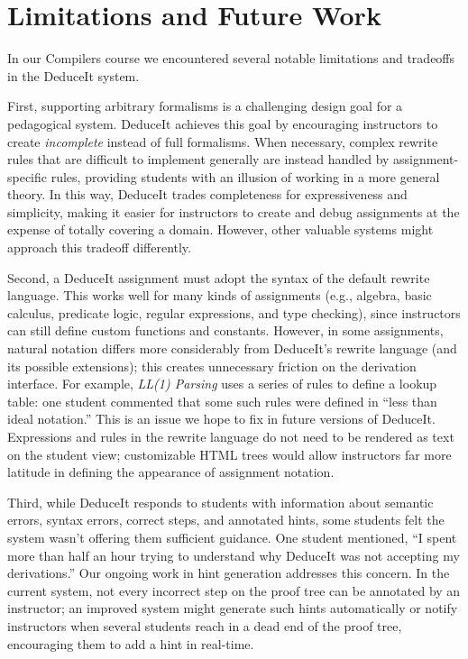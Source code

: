 \documentclass{sigchi}
\begin{document}
\section{Limitations and Future Work}

In our Compilers course we encountered several notable limitations and tradeoffs in the DeduceIt system.

First, supporting arbitrary formalisms is a challenging design goal for a pedagogical system. DeduceIt achieves this goal by encouraging instructors to create \textit{incomplete} instead of full formalisms. When necessary, complex rewrite rules that are difficult to implement generally are instead handled by assignment-specific rules, providing students with an illusion of working in a more general theory. In this way, DeduceIt trades completeness for expressiveness and simplicity, making it easier for instructors to create and debug assignments at the expense of totally covering a domain. However, other valuable systems might approach this tradeoff differently.

Second, a DeduceIt assignment must adopt the syntax of the default rewrite language. This works well for many kinds of assignments (e.g., algebra, basic calculus, predicate logic, regular expressions, and type checking), since instructors can still define custom functions and constants. However, in some assignments, natural notation differs more considerably from DeduceIt's rewrite language (and its possible extensions); this creates unnecessary friction on the derivation interface. For example, \textit{LL(1) Parsing} uses a series of rules to define a lookup table: one student commented that some such rules were defined in ``less than ideal notation.'' %
This is an issue we hope to fix in future versions of DeduceIt. Expressions and rules in the rewrite language do not need to be rendered as text on the student view; customizable HTML trees would allow instructors far more latitude in defining the appearance of assignment notation.

Third, while DeduceIt responds to students with information about semantic errors, syntax errors, correct steps, and annotated hints, some students felt the system wasn't offering them sufficient guidance. One student mentioned, ``I spent more than half an hour trying to understand why DeduceIt was not accepting my derivations.'' Our ongoing work in hint generation addresses this concern. In the current system, not every incorrect step on the proof tree can be annotated by an instructor; an improved system might generate such hints automatically or notify instructors when several students reach in a dead end of the proof tree, encouraging them to add a hint in real-time.
\end{document}

